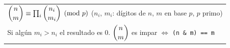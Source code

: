 \begin{center}
\renewcommand{\arraystretch}{2.2}\setlength{\tabcolsep}{10pt}
\begin{tabular}{l}
	$\dbinom{n}{m} \equiv \prod_i \dbinom{n_i}{m_i} \pmod p$ \quad ($n_i$, $m_i$: d\'igitos de $n$, $m$ en base $p$, $p$ primo) \\
	Si alg\'un $m_i > n_i$ el resultado es $0$. \quad $\dbinom{n}{m}$ es impar $\iff$ \texttt{(n \& m) == m} \\
\end{tabular}
\end{center}
